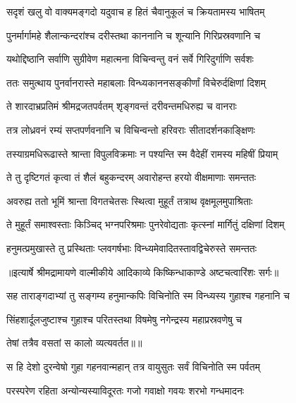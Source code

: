 \twolineshloka
{सदृशं खलु वो वाक्यमङ्गदो यदुवाच ह}
{हितं चैवानुकूलं च क्रियतामस्य भाषितम्} %

\twolineshloka
{पुनर्मार्गामहे शैलान्कन्दरांश्च दरीस्तथा}
{काननानि च शून्यानि गिरिप्रस्रवणानि च} %

\twolineshloka
{यथोद्दिष्ठानि सर्वाणि सुग्रीवेण महात्मना}
{विचिन्वन्तु वनं सर्वे गिरिदुर्गाणि सर्वशः} %

\twolineshloka
{ततः समुत्थाय पुनर्वानरास्ते महाबलाः}
{विन्ध्यकाननसङ्कीर्णां विचेरुर्दक्षिणां दिशम्} %

\twolineshloka
{ते शारदाभ्रप्रतिमं श्रीमद्रजतपर्वतम्}
{शृङ्गवन्तं दरीवन्तमधिरुह्य च वानराः} %

\twolineshloka
{तत्र लोध्रवनं रम्यं सप्तपर्णवनानि च}
{विचिन्वन्तो हरिवराः सीतादर्शनकाङ्क्षिणः} %

\twolineshloka
{तस्याग्रमधिरूढास्ते श्रान्ता विपुलविक्रमाः}
{न पश्यन्ति स्म वैदेहीं रामस्य महिषीं प्रियाम्} %

\twolineshloka
{ते तु दृष्टिगतं कृत्वा तं शैलं बहुकन्दरम्}
{अवारोहन्त हरयो वीक्षमाणाः समन्ततः} %

\twolineshloka
{अवरुह्य ततो भूमिं श्रान्ता विगतचेतसः}
{स्थित्वा मुहूर्तं तत्राथ वृक्षमूलमुपाश्रिताः} %

\twolineshloka
{ते मुहूर्तं समाश्वस्ताः किञ्चिद् भग्नपरिश्रमाः}
{पुनरेवोद्यताः कृत्स्नां मार्गितुं दक्षिणां दिशम्} %

\twolineshloka
{हनुमत्प्रमुखास्ते तु प्रस्थिताः प्लवगर्षभाः}
{विन्ध्यमेवादितस्तावद्विचेरुस्ते समन्ततः} %


{॥इत्यार्षे श्रीमद्रामायणे वाल्मीकीये आदिकाव्ये किष्किन्धाकाण्डे अष्टचत्वारिंशः सर्गः॥}


\twolineshloka
{सह ताराङ्गदाभ्यां तु सङ्गम्य हनुमान्कपिः}
{विचिनोति स्म विन्ध्यस्य गुहाश्च गहनानि च} %

\twolineshloka
{सिंहशार्दूलजुष्टाश्च गुहाश्च परितस्तथा}
{विषमेषु नगेन्द्रस्य महाप्रस्रवणेषु च} %

{तेषां तत्रैव वसतां स कालो व्यत्यवर्तत॥॥} %

\addtocounter{shlokacount}{1}

\twolineshloka
{स हि देशो दुरन्वेषो गुहा गहनवान्महान्}
{तत्र वायुसुतः सर्वं विचिनोति स्म पर्वतम्} %

\twolineshloka
{परस्परेण रहिता अन्योन्यस्याविदूरतः}
{गजो गवाक्षो गवयः शरभो गन्धमादनः} %


